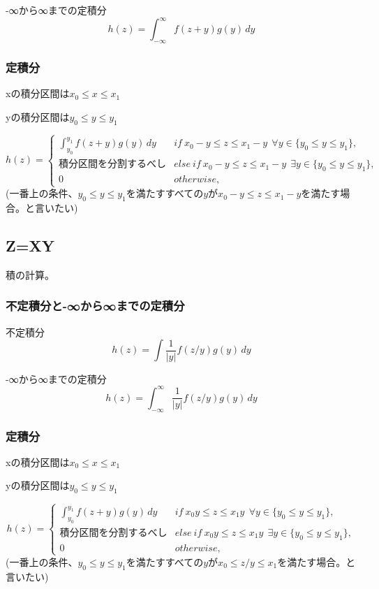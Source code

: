 \documentclass[a4paper,11pt]{ltjsarticle}
\begin{document}
-∞から∞までの定積分
$$
    h(z) = \int_{-\infty}^{\infty} f(z+y) g(y)\,dy
$$
\subsubsection{定積分}
\begin{description}
    \item xの積分区間は$x_0 \leq x \leq x_1$
    \item yの積分区間は$y_0 \leq y \leq y_1$
\end{description}
$$
    h(z)=
    \begin{cases}
        \int_{y_0}^{y_1} f(z+y) g(y)\,dy    & if\ x_0-y \leq z \leq x_1-y \ \ \forall y\in \{ y_0 \leq y \leq y_1\},\\
        積分区間を分割するべし                & else \ if\ x_0-y \leq z \leq x_1-y \ \ \exists y\in \{ y_0 \leq y \leq y_1\}, \\
        0                                   & otherwise,
    \end{cases}
$$
(一番上の条件、$y_0 \leq y \leq y_1$を満たすすべての$y$が$x_0-y \leq z \leq x_1-y$を満たす場合。と言いたい)


\subsection{Z=XY}
積の計算。
\subsubsection{不定積分と-∞から∞までの定積分}
不定積分
$$
    h(z) = \int \frac{1}{|y|} f(z/y) g(y)\,dy
$$

-∞から∞までの定積分
$$
    h(z) = \int_{-\infty}^{\infty} \frac{1}{|y|} f(z/y) g(y)\,dy
$$
\subsubsection{定積分}
\begin{description}
    \item xの積分区間は$x_0 \leq x \leq x_1$
    \item yの積分区間は$y_0 \leq y \leq y_1$
\end{description}
$$
    h(z)=
    \begin{cases}
        \int_{y_0}^{y_1} f(z+y) g(y)\,dy    & if\ x_0y \leq z \leq x_1y \ \ \forall y\in \{ y_0 \leq y \leq y_1\},\\
        積分区間を分割するべし                & else \ if\ x_0y \leq z \leq x_1y \ \ \exists y\in \{ y_0 \leq y \leq y_1\}, \\
        0                                   & otherwise,
    \end{cases}
$$
(一番上の条件、$y_0 \leq y \leq y_1$を満たすすべての$y$が$x_0 \leq z/y \leq x_1$を満たす場合。と言いたい)
\end{document}
